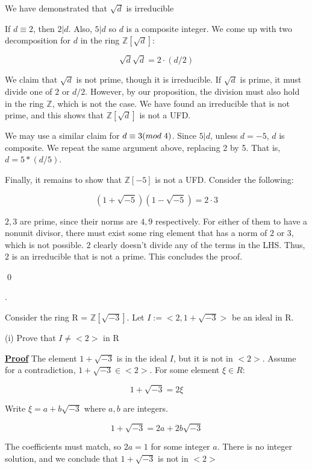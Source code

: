 \documentclass{article}
\def\ZZ{{\mathbb{Z}}}
\def\_{{\hspace{1mm}}}
\newcounter{problemcnt}
\newcommand{\Problem}{{
    \vspace{5mm}
    \stepcounter{problemcnt}
    \noindent
    \arabic{problemcnt}. 
}
}
\newcommand{\Proof}{{
    \vspace{2mm}
    \noindent
    \textbf{
    \underline{Proof}}
}
}
\begin{document}
We have demonstrated that $\sqrt{d}$ is irreducible\checkmark


If $d \equiv 2$, then $2|d$. Also, $5|d$ so $d$ is a composite integer. 
We come up with two decomposition for $d$ in the ring $\ZZ[\sqrt{d}]$:

\[
    \sqrt{d}\sqrt{d} = 2\cdot(d/2)
\]

We claim that $\sqrt{d}$ is not prime, though it is irreducible. 
If $\sqrt{d}$ is prime, it must divide one of $2$ or $d/2$. However, 
by our proposition, the division must also hold in the ring $\ZZ$, which 
is not the case. We have found an irreducible that is not prime, 
and this shows that $\ZZ[\sqrt{d}]$ is not a UFD. 

We may use a similar claim for $d\equiv 3(mod\_4)$. Since $5|d$, 
unless $d = -5$, $d$ is composite. We repeat the same argument above, 
replacing 2 by 5. That is, $d = 5*(d/5)$. 

Finally, it remains to show that $\ZZ[-5]$ is not a UFD. Consider 
the following:

\[
    (1+\sqrt{-5})(1-\sqrt{-5}) = 2\cdot 3    
\]

$2, 3$ are prime, since their norms are $4, 9$ respectively. For either 
of them to have a nonunit divisor, there must exist some ring element that 
has a norm of $2$ or $3$, which is not possible. $2$ clearly doesn't 
divide any of the terms in the LHS. Thus, $2$ is an irreducible that 
is not a prime. This concludes the proof. 

\qed

\newpage
\Problem
Consider the ring R = $\mathbb{Z}
[\sqrt{-3}]$. Let 
$I:=<2, 1+\sqrt{-3}>$ be an ideal in R.

\vspace{2mm}
(i) Prove that $I\neq<2>$ in R 

\Proof The element $1 + \sqrt{-3}$ 
is in the ideal $I$, but it is not in 
$<2>$. Assume for a contradiction, 
$1+\sqrt{-3} \in <2>$. For some element 
$\xi \in R$:

\[
    1+\sqrt{-3} = 2\xi
\]

Write $\xi = a+b\sqrt{-3}$ where $a, b$ are 
integers. 

\[
   1+\sqrt{-3} = 2a+2b\sqrt{-3} 
\]

The coefficients must match, so 
$2a = 1$ for some integer $a$. There is 
no integer solution, and we conclude 
that $1+\sqrt{-3}$ is not in $<2>$
\end{document}
